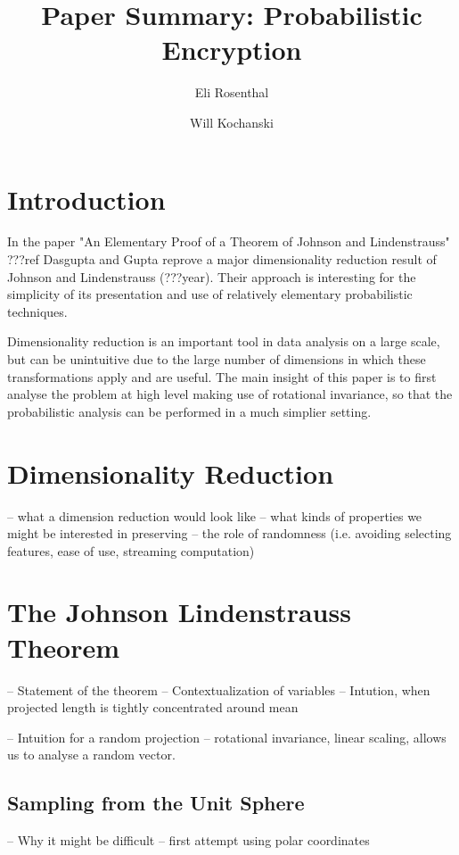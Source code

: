 \documentclass[11pt]{article}
\author{Eli Rosenthal \and Will Kochanski}
\date{}
\title{Paper Summary: Probabilistic Encryption}
\begin{document}
\maketitle
\section{Introduction}
In the paper "An Elementary Proof of a Theorem of Johnson and Lindenstrauss" ???ref Dasgupta and Gupta reprove a major dimensionality reduction result of Johnson and Lindenstrauss (???year). Their approach is interesting for the simplicity of its presentation and use of relatively elementary probabilistic techniques.

Dimensionality reduction is an important tool in data analysis on a large scale, but can be unintuitive due to the large number of dimensions in which these transformations apply and are useful. The main insight of this paper is to first analyse the problem at high level making use of rotational invariance, so that the probabilistic analysis can be performed in a much simplier setting.

\section{Dimensionality Reduction}
-- what a dimension reduction would look like
-- what kinds of properties we might be interested in preserving
-- the role of randomness (i.e. avoiding selecting features, ease of use, streaming computation)

\section{The Johnson Lindenstrauss Theorem}
-- Statement of the theorem
-- Contextualization of variables
-- Intution, when projected length is tightly concentrated around mean

-- Intuition for a random projection
-- rotational invariance, linear scaling, allows us to analyse a random vector.

\subsection{Sampling from the Unit Sphere}
-- Why it might be difficult
-- first attempt using polar coordinates
\end{document}
